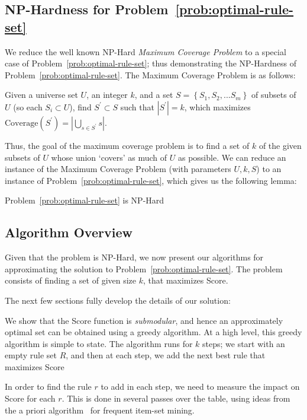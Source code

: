 \subsection{NP-Hardness for Problem~\ref{prob:optimal-rule-set}}
We reduce the well known NP-Hard {\em Maximum Coverage Problem} to a special case of Problem~\ref{prob:optimal-rule-set};
thus demonstrating the NP-Hardness of Problem~\ref{prob:optimal-rule-set}. The Maximum Coverage Problem is as follows: 
\begin{problem}\label{prob:maximum-coverage}
Given a universe set $U$, an integer $k$, and a set $S = \left\lbrace S_1, S_2, ... S_m \right\rbrace$ of subsets of $U$ (so each $S_i \subset U$), find $S^{\prime} \subset S$ such that $|S^{\prime}| = k$, which maximizes $\text{Coverage}(S^{\prime}) = |\bigcup_{s \in S^{\prime}} s|$.
\end{problem}
Thus, the goal of the maximum coverage problem is to find a set of $k$ of the given subsets of $U$ whose union `covers' as much of $U$ as possible. We can reduce an instance of the Maximum Coverage Problem (with parameters $U, k, S$) to an instance of Problem~\ref{prob:optimal-rule-set}, which gives us the following lemma:
\begin{lemma}
Problem~\ref{prob:optimal-rule-set} is NP-Hard
\end{lemma}

\subsection{Algorithm Overview}\label{sec:alg-overview}
Given that the problem is NP-Hard, we now present our algorithms 
for approximating the solution to Problem~\ref{prob:optimal-rule-set}. 
The problem consists of finding a set of given size $k$, that maximizes 
Score. 


The next few sections fully develop the
details of our solution:

\squishlist
\item We show that the Score function is {\em submodular}, and hence an approximately optimal set can be obtained using a greedy algorithm. At a high level, this greedy algorithm is simple to state. The algorithm runs for $k$ steps;
we start with an empty rule set $R$, and then at each step, we add the next best rule that maximizes Score
 
\item In order to find the rule $r$ to add in each step, we need to measure the impact on Score for each $r$. This is done in several passes over the table, using ideas from the a priori algorithm~\cite{apriori} for frequent item-set mining. 
\squishend

